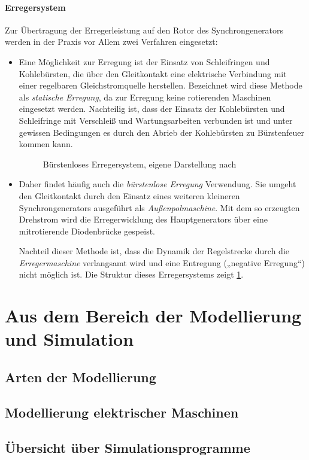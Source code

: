 \paragraph{Erregersystem}
Zur Übertragung der Erregerleistung auf den Rotor des Synchrongenerators werden in der Praxis vor Allem zwei Verfahren eingesetzt:\begin{itemize}
    \item Eine Möglichkeit zur Erregung ist der Einsatz von Schleifringen und Kohlebürsten, die über den Gleitkontakt eine elektrische Verbindung mit einer regelbaren Gleichstromquelle herstellen. Bezeichnet wird diese Methode als \emph{statische Erregung}, da zur Erregung keine rotierenden Maschinen eingesetzt werden. Nachteilig ist, dass der Einsatz der Kohlebürsten und Schleifringe mit Verschleiß und Wartungsarbeiten verbunden ist und unter gewissen Bedingungen es durch den Abrieb der Kohlebürsten zu Bürstenfeuer kommen kann.
    \begin{figure}
        \centering
        
        \caption{Bürstenloses Erregersystem, eigene Darstellung nach \cite[S. 557]{mullerGrundlagenElektrischerMaschinen2005}}
        \label{fig:burstenloseErregung}
    \end{figure}
    \item Daher findet häufig auch die \emph{bürstenlose Erregung} Verwendung. Sie umgeht den Gleitkontakt durch den Einsatz eines weiteren kleineren Synchrongenerators ausgeführt als \emph{Außenpolmaschine}. Mit dem so erzeugten Drehstrom wird die Erregerwicklung des Hauptgenerators über eine mitrotierende Diodenbrücke gespeist. 
    
    Nachteil dieser Methode ist, dass die Dynamik der Regelstrecke durch die \emph{Erregermaschine} verlangsamt wird und eine Entregung („negative Erregung“) nicht möglich ist. Die Struktur dieses Erregersystems zeigt \cref{fig:burstenloseErregung}. 
\end{itemize}

\section{Aus dem Bereich der Modellierung und Simulation}
\label{sec:GrundlagenModellierung}

\subsection{Arten der Modellierung}
\label{subsec:ArtenModellierung}

\subsection{Modellierung elektrischer Maschinen}
\label{subsec:ModellierungElektrischerMaschinen}

\subsection{Übersicht über Simulationsprogramme}
\label{subsec:Simulationsprogramme}
